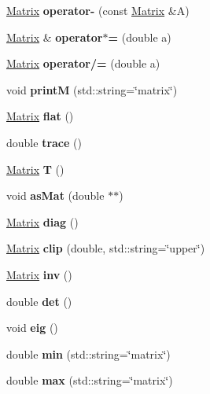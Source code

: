 \begin{DoxyCompactItemize}
\hyperlink{classMatrix}{Matrix} {\bfseries operator-\/} (const \hyperlink{classMatrix}{Matrix} \&A)
\item 
\mbox{\label{classMatrix_a4bd84764194d66b36df5134992bbfdcc}} 
\hyperlink{classMatrix}{Matrix} \& {\bfseries operator$\ast$=} (double a)
\item 
\mbox{\label{classMatrix_ae0dffcc49e94db64e5f85f49622b4f3b}} 
\hyperlink{classMatrix}{Matrix} {\bfseries operator/=} (double a)
\item 
\mbox{\label{classMatrix_ad9db57feb80b159997d121a8d55c055c}} 
void {\bfseries printM} (std\+::string=\char`\"{}matrix\char`\"{})
\item 
\mbox{\label{classMatrix_a347fdd0b8505557b28376d36fd965647}} 
\hyperlink{classMatrix}{Matrix} {\bfseries flat} ()
\item 
\mbox{\label{classMatrix_af7403d8c02553a4fba253380e4e0bc40}} 
double {\bfseries trace} ()
\item 
\mbox{\label{classMatrix_a4e2ee8ad0e6621315f6b68034114ba74}} 
\hyperlink{classMatrix}{Matrix} {\bfseries T} ()
\item 
\mbox{\label{classMatrix_a84d6198a8bbb5637b85ecb4c58e34cb8}} 
void {\bfseries as\+Mat} (double $\ast$$\ast$)
\item 
\mbox{\label{classMatrix_a9ab1bacd38c2090314786bba2844da3c}} 
\hyperlink{classMatrix}{Matrix} {\bfseries diag} ()
\item 
\mbox{\label{classMatrix_a8975aa6c948bcc13588fbc580bd975ed}} 
\hyperlink{classMatrix}{Matrix} {\bfseries clip} (double, std\+::string=\char`\"{}upper\char`\"{})
\item 
\mbox{\label{classMatrix_a7611488b98f9c291c86cb2ea47b1b56a}} 
\hyperlink{classMatrix}{Matrix} {\bfseries inv} ()
\item 
\mbox{\label{classMatrix_ace95025dd985ddaa6c1ed72e8b464a0a}} 
double {\bfseries det} ()
\item 
\mbox{\label{classMatrix_a57f323186a181dd2ed6519b0f86f4338}} 
void {\bfseries eig} ()
\item 
\mbox{\label{classMatrix_a6edacac0a051ed4a8e4c93adb6ff3de2}} 
double {\bfseries min} (std\+::string=\char`\"{}matrix\char`\"{})
\item 
\mbox{\label{classMatrix_ad290e450fead39c024466cf0ba602c7e}} 
double {\bfseries max} (std\+::string=\char`\"{}matrix\char`\"{})
\end{DoxyCompactItemize}
